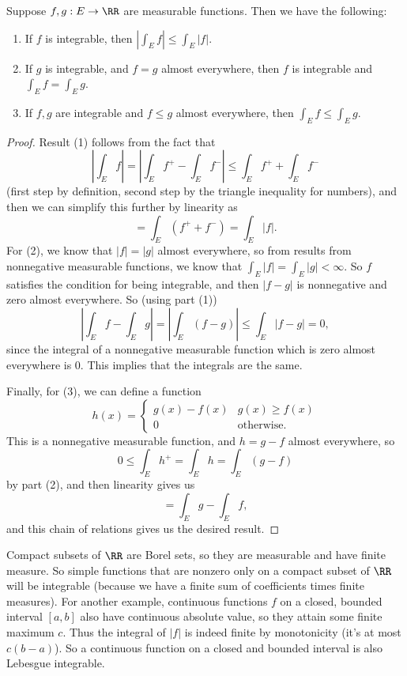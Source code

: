 \begin{proposition}
Suppose $f, g: E \to \RR$ are measurable functions. Then we have the following:
\begin{enumerate}
\item If $f$ is integrable, then $\left|\int_E f \right| \le \int_E |f|$.
\item If $g$ is integrable, and $f = g$ almost everywhere, then $f$ is integrable and $\int_E f = \int_E g$. 
\item If $f, g$ are integrable and $f \le g$ almost everywhere, then $\int_E f \le \int_E g$. 
\end{enumerate}
\end{proposition}
\begin{proof}
Result (1) follows from the fact that 
\[
    \left| \int_E f \right| = \left| \int_E f^+ - \int_E f^- \right| \le \int_E f^+ + \int_E f^- 
\]
(first step by definition, second step by the triangle inequality for numbers), and then we can simplify this further by linearity as 
\[
    = \int_E (f^+ + f^-) = \int_E |f|. 
\]
For (2), we know that $|f| = |g|$ almost everywhere, so from results from nonnegative measurable functions, we know that $\int_E |f| = \int_E |g| < \infty$. So $f$ satisfies the condition for being integrable, and then $|f-g|$ is nonnegative and zero almost everywhere. So (using part (1))
\[
    \left|\int_E f - \int_E g\right| = \left|\int_E (f-g) \right| \le \int_E |f-g| = 0,
\]
since the integral of a nonnegative measurable function which is zero almost everywhere is $0$. This implies that the integrals are the same.

Finally, for (3), we can define a function
\[
    h(x) = \begin{cases} g(x) - f(x) & g(x) \ge f(x) \\ 0 & \text{otherwise}. \end{cases}
\]
This is a nonnegative measurable function, and $h = g-f$ almost everywhere, so 
\[
    0 \le \int_E h^+ = \int_E h = \int_E (g-f)
\]
by part (2), and then linearity gives us 
\[
    = \int_E g - \int_E f,
\]
and this chain of relations gives us the desired result.
\end{proof}

\begin{remark}
Compact subsets of $\RR$ are Borel sets, so they are measurable and have finite measure. So simple functions that are nonzero only on a compact subset of $\RR$ will be integrable (because we have a finite sum of coefficients times finite measures). For another example, continuous functions $f$ on a closed, bounded interval $[a, b]$ also have continuous absolute value, so they attain some finite maximum $c$. Thus the integral of $|f|$ is indeed finite by monotonicity (it's at most $c(b-a)$). So a continuous function on a closed and bounded interval is also Lebesgue integrable.
\end{remark}

